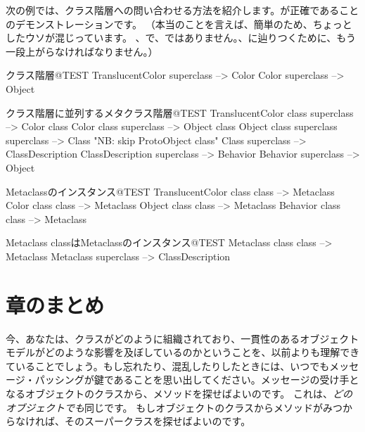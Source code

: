 \documentclass[a4paper,10pt,twoside]{book}
\begin{document}
次の例では、クラス階層への問い合わせる方法を紹介します。が正確であることのデモンストレーションです。
（本当のことを言えば、簡単のため、ちょっとしたウソが混じっています。 、で、ではありません。、に辿りつくために、もう一段上がらなければなりません。）

\begin{example}{クラス階層}{@TEST}
TranslucentColor superclass --> Color
Color superclass                   --> Object
\end{example}

\begin{example}{クラス階層に並列するメタクラス階層}{@TEST}
TranslucentColor class superclass   --> Color class
Color class superclass                     --> Object class
Object class superclass superclass --> Class    "NB: skip ProtoObject class"
Class superclass                              --> ClassDescription
ClassDescription superclass            --> Behavior
Behavior superclass                         --> Object
\end{example}

\begin{example}{Metaclassのインスタンス}{@TEST}
TranslucentColor class class --> Metaclass
Color class class                   --> Metaclass
Object class class                 --> Metaclass
Behavior class class              --> Metaclass
\end{example}
\begin{example}{Metaclass classはMetaclassのインスタンス}{@TEST}
Metaclass class class --> Metaclass
Metaclass superclass --> ClassDescription
\end{example}

\section{章のまとめ}
今、あなたは、クラスがどのように組織されており、一貫性のあるオブジェクトモデルがどのような影響を及ぼしているのかということを、以前よりも理解できていることでしょう。もし忘れたり、混乱したりしたときには、いつでもメッセージ・パッシングが鍵であることを思い出してください。メッセージの受け手となるオブジェクトのクラスから、メソッドを探せばよいのです。
これは、\emph{どのオブジェクトでも}同じです。
もしオブジェクトのクラスからメソッドがみつからなければ、そのスーパークラスを探せばよいのです。
\end{document}
